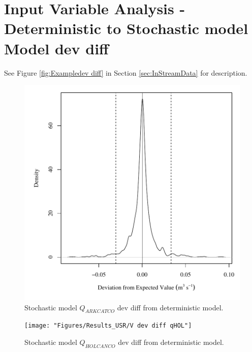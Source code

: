 
\section{Input Variable Analysis - Deterministic to Stochastic model Model dev diff}
\label{App:VarDiff}
\vspace{12pt}
See Figure \ref{fig:Exampledev diff} in Section \ref{sec:InStreamData} for description.

\begin{center}
\begin{figure}[htbp]
	\includegraphics[width=6in]{"Figures/Results_USR/V dev diff qin"}
	\caption{Stochastic model $Q_{ARKCATCO}$ dev diff from deterministic model.}
\end{figure}
\end{center}
\newpage

\begin{center}
\begin{figure}[htbp]
	\texttt{[image: "Figures/Results\_USR/V dev diff  qHOL"]}
	\caption{Stochastic model $Q_{HOLCANCO}$ dev diff from deterministic model.}
\end{figure}
\end{center}
\newpage

